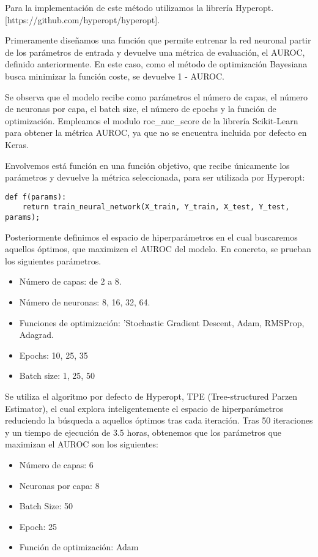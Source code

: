\documentclass{report}
\begin{document}
Para la implementación de este método utilizamos la librería Hyperopt.
{[}https://github.com/hyperopt/hyperopt{]}.

Primeramente diseñamos una función que permite entrenar la red neuronal
partir de los parámetros de entrada y devuelve una métrica de
evaluación, el AUROC, definido anteriormente. En este caso, como el
método de optimización Bayesiana busca minimizar la función coste, se
devuelve 1 - AUROC.

Se observa que el modelo recibe como parámetros el número de capas, el número de neuronas por capa, el batch size, el número de epochs y la función de optimización.
Empleamos el modulo roc\_auc\_score de la librería Scikit-Learn para obtener la métrica AUROC, ya que no se encuentra incluida por defecto en Keras. 

Envolvemos está función en una función objetivo, que recibe únicamente los parámetros y devuelve la métrica seleccionada, para ser utilizada por Hyperopt:
\begin{lstlisting}
def f(params):
    return train_neural_network(X_train, Y_train, X_test, Y_test, params);
\end{lstlisting}
\newpage
Posteriormente definimos el espacio de hiperparámetros en el cual buscaremos aquellos óptimos, que maximizen el AUROC del modelo.  En concreto, se prueban los siguientes parámetros.

\begin{itemize}
\item Número de capas: de 2 a 8.
\item Número de neuronas: 8, 16, 32, 64.
\item Funciones de optimización: 'Stochastic Gradient Descent, Adam, RMSProp, Adagrad.
\item Epochs: 10, 25, 35
\item Batch size: 1, 25, 50
\end{itemize}

Se utiliza el algoritmo por defecto de Hyperopt, TPE (Tree-structured Parzen Estimator), el cual explora inteligentemente el espacio de hiperparámetros reduciendo la búsqueda a aquellos óptimos tras cada iteración. 
Tras 50 iteraciones y un tiempo de ejecución de 3.5 horas, obtenemos que los parámetros que maximizan el AUROC son los siguientes:

\begin{itemize}
\item Número de capas: 6
\item Neuronas por capa: 8
\item Batch Size: 50
\item  Epoch: 25
\item Función de optimización: Adam
\end{itemize}
\end{document}
